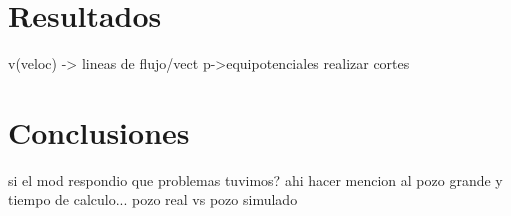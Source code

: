 \documentclass[10pt,a4paper,final]{article}
\begin{document}
\section{Resultados}
v(veloc) -> lineas de flujo/vect
p->equipotenciales
realizar cortes
\section{Conclusiones}
si el mod respondio
que problemas tuvimos? ahi hacer mencion al pozo grande y tiempo de calculo...
pozo real vs pozo simulado
\end{document}

